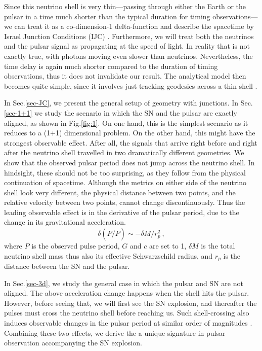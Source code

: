 \documentclass[aps,showpacs,onecolumn,floats,prd,superscriptaddress,nofootinbib]{revtex4}
\begin{document}
Since this neutrino shell is very thin---passing through either the Earth or the pulsar in a time much shorter than the typical duration for timing observations---we can treat it as a co-dimension-1 delta-function and describe the spacetime by Israel Junction Conditions (IJC) \cite{Isr66}. Furthermore, we will treat both the neutrinos and the pulsar signal as propagating at the speed of light. In reality that is not exactly true, with photons moving even slower than neutrinos. Nevertheless, the time delay is again much shorter compared to the duration of timing observations, thus it does not invalidate our result. The analytical model then becomes quite simple, since it involves just tracking geodesics across a thin shell \cite{BouFre07,JohYan10,OluPie13}.

In Sec.\ref{sec-JC}, we present the general setup of geometry with junctions. In Sec.\ref{sec-1+1} we study the scenario in which the SN and the pulsar are exactly aligned, as shown in Fig.\ref{fig:1}. On one hand, this is the simplest scenario as it reduces to a (1+1) dimensional problem. On the other hand, this might have the strongest observable effect. After all, the signals that arrive right before and right after the neutrino shell travelled in two dramatically different geometries. We show that the observed pulsar period does not jump across the neutrino shell. In hindsight, these should not be too surprising, as they follow from the physical continuation of spacetime. Although the metrics on either side of the neutrino shell look very different, the physical distance between two points, and the relative velocity between two points, cannot change discontinuously. %
Thus the leading observable effect is in the derivative of the pulsar period, due to the change in its gravitational acceleration. 
\begin{equation}
\delta(\dot{P}/P) \sim -\delta M / r_p^2~,
\label{eq-main}
\end{equation}
where $P$ is the observed pulse period, $G$ and $c$ are set to 1, $\delta M$ is the total neutrino shell mass thus also its effective Schwarzschild radius, and $r_p$ is the distance between the SN and the pulsar. 

In Sec.\ref{sec-3d}, we study the general case in which the pulsar and SN are not aligned. The above acceleration change happens when the shell hits the pulsar. However, before seeing that, we will first see the SN explosion, and thereafter the pulses must cross the neutrino shell before reaching us. Such shell-crossing also induces observable changes in the pulsar period at similar order of magnitudes \cite{OluPie13}. Combining these two effects, we derive the a unique signature in pulsar observation accompanying the SN explosion.
\end{document}
